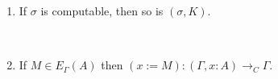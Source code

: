 \begin{lemma}
\begin{enumerate}
\item
If $\sigma$ is computable, then so is $(\sigma , K)$.

\begin{code}%
\>  \AgdaSymbol{:}  \AgdaSymbol{\{}\AgdaSymbol{\}} \AgdaSymbol{\{}\AgdaSymbol{\}} \AgdaSymbol{\{} \AgdaSymbol{:}   \AgdaSymbol{\}} \AgdaSymbol{\{}\AgdaSymbol{\}} \AgdaSymbol{\{}\AgdaSymbol{\}} \AgdaSymbol{\{}\AgdaSymbol{\}} \AgdaSymbol{\{}\AgdaSymbol{\}} \<%
\\
\>[17]\<[20]%
\>[20]          \AgdaSymbol{(} \AgdaInductiveConstructor{,} \AgdaSymbol{)}  \AgdaSymbol{(} \AgdaInductiveConstructor{,}    \AgdaSymbol{)}\<%
\end{code}

\item
If $M \in E_\Gamma(A)$ then $(x := M) : (Γ , x : A) \rightarrow_C \Gamma$.

\begin{code}%
\>  \AgdaSymbol{:}  \AgdaSymbol{\{} \AgdaSymbol{\}} \AgdaSymbol{\{} \AgdaSymbol{:}  \AgdaSymbol{\}} \AgdaSymbol{\{} \AgdaSymbol{:}   \AgdaSymbol{(} \AgdaSymbol{)\}} \AgdaSymbol{\{} \AgdaSymbol{:}   \AgdaSymbol{(} \AgdaSymbol{)\}} \<%
\\
\>[17]\<[20]%
\>[20]        \AgdaSymbol{(} \AgdaInductiveConstructor{,} \AgdaSymbol{)}  \<%
\end{code}


\end{enumerate}
\end{lemma}

